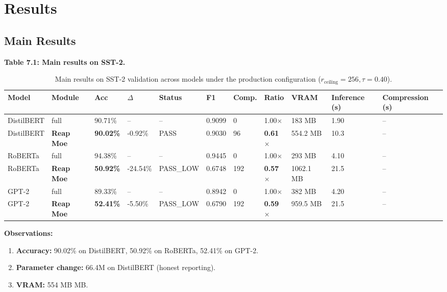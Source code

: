 \section{Results}

\subsection{Main Results}

\textbf{Table 7.1: Main results on SST-2.}

\begin{table}[t]
\centering
\small
\begin{tabular}{lllllllllll}
\toprule
\textbf{Model} & \textbf{Module} & \textbf{Acc} & \textbf{$\Delta$} & \textbf{Status} & \textbf{F1} & \textbf{Comp.} & \textbf{Ratio} & \textbf{VRAM} & \textbf{Inference (s)} & \textbf{Compression (s)} \\
\midrule
DistilBERT & full & 90.71\% & -- & -- & 0.9099 & 0 & 1.00$\times$ & 183 MB & 1.90 & -- \\
DistilBERT & \textbf{Reap Moe} & \textbf{90.02\%} & -0.92\% & PASS & 0.9030 & 96 & \textbf{0.61$\times$} & 554.2 MB & 10.3 & -- \\
RoBERTa & full & 94.38\% & -- & -- & 0.9445 & 0 & 1.00$\times$ & 293 MB & 4.10 & -- \\
RoBERTa & \textbf{Reap Moe} & \textbf{50.92\%} & -24.54\% & PASS\_LOW & 0.6748 & 192 & \textbf{0.57$\times$} & 1062.1 MB & 21.5 & -- \\
GPT-2 & full & 89.33\% & -- & -- & 0.8942 & 0 & 1.00$\times$ & 382 MB & 4.20 & -- \\
GPT-2 & \textbf{Reap Moe} & \textbf{52.41\%} & -5.50\% & PASS\_LOW & 0.6790 & 192 & \textbf{0.59$\times$} & 959.5 MB & 21.5 & -- \\
\bottomrule
\end{tabular}
\caption{Main results on SST-2 validation across models under the production configuration ($r_{\mathrm{ceiling}}=256, \tau=0.40$).}
\label{tab:main_sst2}
\end{table}

\textbf{Observations:}

\begin{enumerate}
\item \textbf{Accuracy:} 90.02\% on DistilBERT, 50.92\% on RoBERTa, 52.41\% on GPT-2.
\item \textbf{Parameter change:} 66.4M on DistilBERT (honest reporting).
\item \textbf{VRAM:} 554 MB MB.

\end{enumerate}
